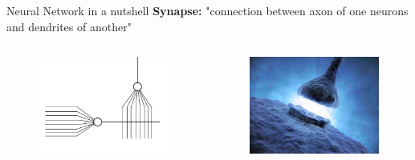 \documentclass[10pt]{beamer}
\begin{document}
	\begin{frame}[c]{Neural Network in a nutshell}
		\large{\textbf{Synapse:} "connection between axon of one neurons and dendrites of another"}
		\begin{columns}
			\begin{column}{0.5\textwidth}
				\begin{center}
					\begin{figure}
						\includegraphics[width=0.9\linewidth]{images/sonn3}
					\end{figure}
				\end{center}
			\end{column}
			\begin{column}{0.5\textwidth}
				\begin{center}
					\begin{figure}
						\includegraphics[width=0.9\linewidth]{images/synapse}
					\end{figure}
				\end{center}
			\end{column}
		\end{columns}
	\end{frame}
\end{document}
